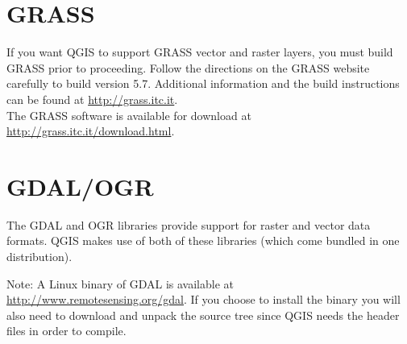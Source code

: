 \documentclass[a4paper,10pt]{article}
\begin{document}
\section{GRASS}
If you want QGIS to support GRASS vector and raster layers, you must build GRASS prior to proceeding. 
Follow the directions on the GRASS website carefully to build version 5.7. Additional information and the build instructions can be found at \url{http://grass.itc.it}.\\
 
The GRASS software is available for download at \url{http://grass.itc.it/download.html}.

\section{GDAL/OGR}
  The GDAL and OGR libraries provide support for raster and vector data formats. QGIS makes use of both of these libraries (which come bundled in one distribution).

  Note: A Linux binary of GDAL is available at \url{http://www.remotesensing.org/gdal}. If you choose to install the binary you will also need to download and unpack the source tree since QGIS needs the header files in order to compile.
  
\end{document}
